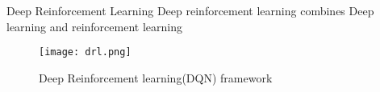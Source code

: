 \begin{frame}{Deep Reinforcement Learning}
    Deep reinforcement learning combines Deep learning and reinforcement learning
    \begin{figure}
        \centering
        \texttt{[image: drl.png]}\\
        \caption{Deep Reinforcement learning(DQN) framework}
        \label{fig:drl}
    \end{figure}
\end{frame}
